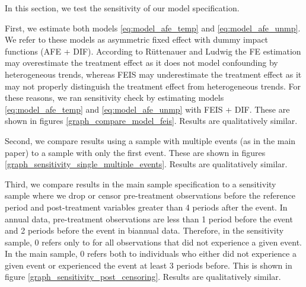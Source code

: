 In this section, we test the sensitivity of our model specification.  

First, we estimate both models \ref{eq:model_afe_temp} and \ref{eq:model_afe_unmp}.  We refer to these models as asymmetric fixed effect with dummy impact functions (AFE + DIF).  According to Rüttenauer and Ludwig \citeyearpar{ruttenauer_fixed_2020} the FE estimation may overestimate the treatment effect as it does not model confounding by heterogeneous trends, whereas FEIS may underestimate the treatment effect as it may not properly distinguish the treatment effect from heterogeneous trends. For these reasons, we ran sensitivity check by estimating models \ref{eq:model_afe_temp} and \ref{eq:model_afe_unmp} with FEIS + DIF.  These are shown in figures \ref{graph_compare_model_feis}.  Results are qualitatively similar.

Second, we compare results using a sample with multiple events (as in the main paper) to a sample with only the first event.  These are shown in figures \ref{graph_sensitivity_single_multiple_events}.  Results are qualitatively similar.

Third, we compare results in the main sample specification to a sensitivity sample where we drop or censor pre-treatment observations before the reference period and post-treatment variables greater than 4 periods after the event.  In annual data, pre-treatment observations are less than 1 period before the event and 2 periods before the event in biannual data.  Therefore, in the sensitivity sample, 0 refers only to for all observations that did not experience a given event.  In the main sample, 0 refers both to individuals who either did not experience a given event or experienced the event at least 3 periods before.  This is shown in figure \ref{graph_sensitivity_post_censoring}.  Results are qualitatively similar.

\begin{sidewaysfigure}
    \caption{Methods: FE + DIF (as in the paper) vs. FEIS + DIF}
    \label{graph_compare_model_feis}
\end{sidewaysfigure}

\begin{sidewaysfigure}[!h]
    \caption{Compare multiple events (as in the paper) vs. first, single event}
    \label{graph_sensitivity_single_multiple_events}
\end{sidewaysfigure}{}

